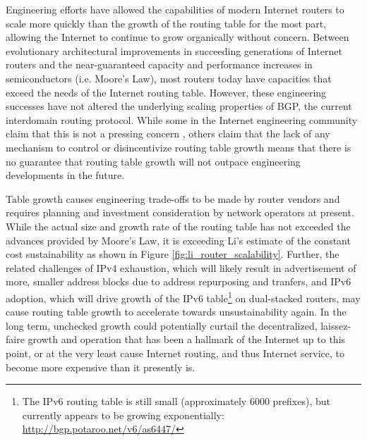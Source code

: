 


Engineering efforts have allowed the capabilities of modern Internet routers to scale more quickly than the growth of the routing table for the most part, allowing the Internet to continue to grow organically without concern. Between evolutionary architectural improvements in succeeding generations of Internet routers \cite{McKeown:2006kx} and the near-guaranteed capacity and performance increases in semiconductors (i.e. Moore's Law), most routers today have capacities that exceed the needs of the Internet routing table. However, these engineering successes have not altered the underlying scaling properties of BGP, the current interdomain routing protocol. While some in the Internet engineering community claim that this is not a pressing concern \cite{Huston:2011ys, Huston:2009dq}, others \cite{Li:2011vn} claim that the lack of any mechanism to control or disincentivize routing table growth means that there is no guarantee that routing table growth will not outpace engineering developments in the future.

Table growth causes engineering trade-offs to be made by router vendors \cite{Li:2011vn, Fall:2009fk} and requires planning and investment consideration by network operators \cite{Zhao:2010fu} at present. While the actual size and growth rate of the routing table has not exceeded the advances provided by Moore's Law, it is exceeding Li's estimate of the constant cost sustainability as shown in Figure \ref{fig:li_router_scalability}. Further, the related challenges of IPv4 exhaustion, which will likely result in advertisement of more, smaller address blocks due to address repurposing and tranfers, and IPv6 adoption, which will drive growth of the IPv6 table\footnote{The IPv6 routing table is still small (approximately 6000 prefixes), but currently appears to be growing exponentially: \url{http://bgp.potaroo.net/v6/as6447/}} on dual-stacked routers, may cause routing table growth to accelerate towards unsustainability again. In the long term, unchecked growth could potentially curtail the decentralized, laissez-faire growth and operation that has been a hallmark of the Internet up to this point, or at the very least cause Internet routing, and thus Internet service, to become more expensive than it presently is.

